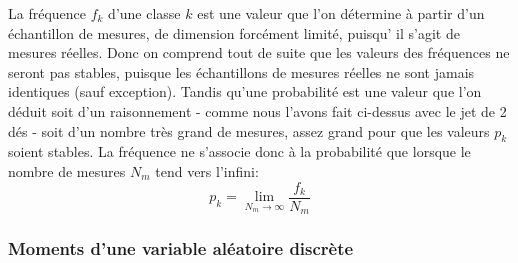 \documentclass[main.tex]{subfiles}
\begin{document}
La fréquence $f_k$ d'une classe $k$ est une valeur que l'on détermine à partir d'un échantillon de mesures, de dimension forcément limité, puisqu’ il s'agit de mesures réelles. Donc on comprend tout de suite que les valeurs des fréquences ne seront pas stables, puisque les échantillons de mesures réelles ne sont jamais identiques (sauf exception). Tandis qu'une probabilité est une valeur que l'on déduit soit d'un raisonnement - comme nous l'avons fait ci-dessus avec le jet de 2 dés - soit d'un nombre très grand de mesures, assez grand pour que les valeurs $p_k$ soient stables. La fréquence ne s'associe donc à la probabilité que lorsque le nombre de mesures $N_m$ tend vers l'infini:
\begin{equation}
    p_k=\lim_{N_m\rightarrow\infty}\frac{f_k}{N_m}
\end{equation}

\newpage
\subsubsection{Moments d'une variable aléatoire discrète}\label{par:mdvad}
\end{document}
